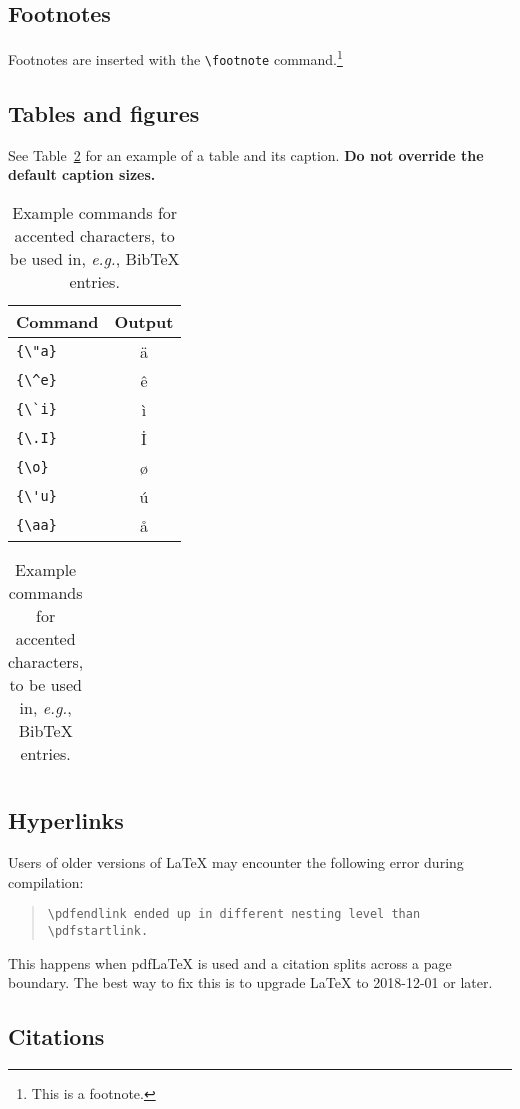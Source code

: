 \documentclass[11pt]{article}
\begin{document}
\subsection{Footnotes}

Footnotes are inserted with the \verb|\footnote| command.\footnote{This is a footnote.}

\subsection{Tables and figures}

See Table~\ref{tab:accents} for an example of a table and its caption.
\textbf{Do not override the default caption sizes.}

\begin{table}
\centering
\begin{tabular}{lc}
\hline
\textbf{Command} & \textbf{Output}\\
\hline
\verb|{\"a}| & {\"a} \\
\verb|{\^e}| & {\^e} \\
\verb|{\`i}| & {\`i} \\ 
\verb|{\.I}| & {\.I} \\ 
\verb|{\o}| & {\o} \\
\verb|{\'u}| & {\'u}  \\ 
\verb|{\aa}| & {\aa}  \\\hline
\end{tabular}
\begin{tabular}{lc}
\hline
\end{tabular}
\caption{Example commands for accented characters, to be used in, \emph{e.g.}, Bib\TeX{} entries.}
\label{tab:accents}
\end{table}

\subsection{Hyperlinks}

Users of older versions of \LaTeX{} may encounter the following error during compilation: 
\begin{quote}
\tt\verb|\pdfendlink| ended up in different nesting level than \verb|\pdfstartlink|.
\end{quote}
This happens when pdf\LaTeX{} is used and a citation splits across a page boundary. The best way to fix this is to upgrade \LaTeX{} to 2018-12-01 or later.

\subsection{Citations}
\end{document}
